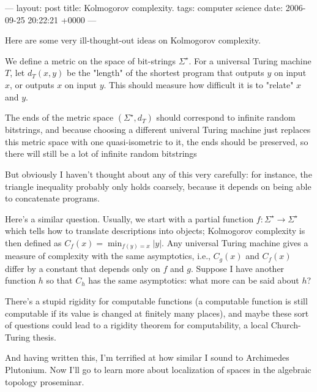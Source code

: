 ---
layout: post
title: Kolmogorov complexity.
tags: computer science
date: 2006-09-25 20:22:21 +0000
---

Here are some very ill-thought-out ideas on Kolmogorov complexity.

We define a metric on the space of bit-strings $\Sigma^\star$.  For a universal Turing machine $T$, let $d_T(x,y)$ be the "length" of the shortest program that outputs $y$ on input $x$, or outputs $x$ on input $y$.  This should measure how difficult it is to "relate" $x$ and $y$.

The ends of the metric space $(\Sigma^\star, d_T)$ should correspond to infinite random bitstrings, and because choosing a different univeral Turing machine just replaces this metric space with one quasi-isometric to it, the ends should be preserved, so there will still be a lot of infinite random bitstrings

But obviously I haven't thought about any of this very carefully: for instance, the triangle inequality probably only holds coarsely, because it depends on being able to concatenate programs.

Here's a similar question.  Usually, we start with a partial function $f : \Sigma^\star \to \Sigma^\star$ which tells how to translate descriptions into objects; Kolmogorov complexity is then defined as $C_f(x) = \min_{f(y) = x} |y|$.  Any universal Turing machine gives a measure of complexity with the same asymptotics, i.e., $C_g(x)$ and $C_f(x)$ differ by a constant that depends only on $f$ and $g$.  Suppose I have another function $h$ so that $C_h$ has the same asymptotics: what more can be said about $h$?

There's a stupid rigidity for computable functions (a computable function is still computable if its value is changed at finitely many places), and maybe these sort of questions could lead to a rigidity theorem for computability, a local Church-Turing thesis.

And having written this, I'm terrified at how similar I sound to Archimedes Plutonium.  Now I'll go to learn more about localization of spaces in the algebraic topology proseminar.

